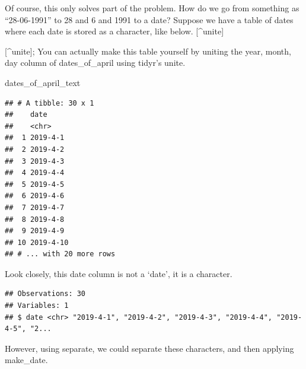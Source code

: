 \documentclass[]{tufte-book}
\newenvironment{Shaded}{}{}
\newcommand{\DataTypeTok}[1]{\textcolor[rgb]{0.56,0.13,0.00}{#1}}
\newcommand{\KeywordTok}[1]{\textcolor[rgb]{0.00,0.44,0.13}{\textbf{#1}}}
\newcommand{\NormalTok}[1]{#1}
\newcommand{\OperatorTok}[1]{\textcolor[rgb]{0.40,0.40,0.40}{#1}}
\newcommand{\StringTok}[1]{\textcolor[rgb]{0.25,0.44,0.63}{#1}}
\begin{document}
Of course, this only solves part of the problem. How do we go from something as ``28-06-1991'' to 28 and 6 and 1991 to a date? Suppose we have a table of dates where each date is stored as a character, like below. {[}\^{}unite{]}

{[}\^{}unite{]}; You can actually make this table yourself by uniting the year, month, day column of dates\_of\_april using tidyr's unite.

\begin{Shaded}
\begin{Highlighting}[]
\NormalTok{dates_of_april_text}
\end{Highlighting}
\end{Shaded}

\begin{verbatim}
## # A tibble: 30 x 1
##    date     
##    <chr>    
##  1 2019-4-1 
##  2 2019-4-2 
##  3 2019-4-3 
##  4 2019-4-4 
##  5 2019-4-5 
##  6 2019-4-6 
##  7 2019-4-7 
##  8 2019-4-8 
##  9 2019-4-9 
## 10 2019-4-10
## # ... with 20 more rows
\end{verbatim}

Look closely, this date column is not a `date', it is a character.

\begin{Shaded}
\end{Shaded}

\begin{verbatim}
## Observations: 30
## Variables: 1
## $ date <chr> "2019-4-1", "2019-4-2", "2019-4-3", "2019-4-4", "2019-4-5", "2...
\end{verbatim}

However, using separate, we could separate these characters, and then applying make\_date.

\begin{Shaded}
\end{Shaded}
\end{document}
